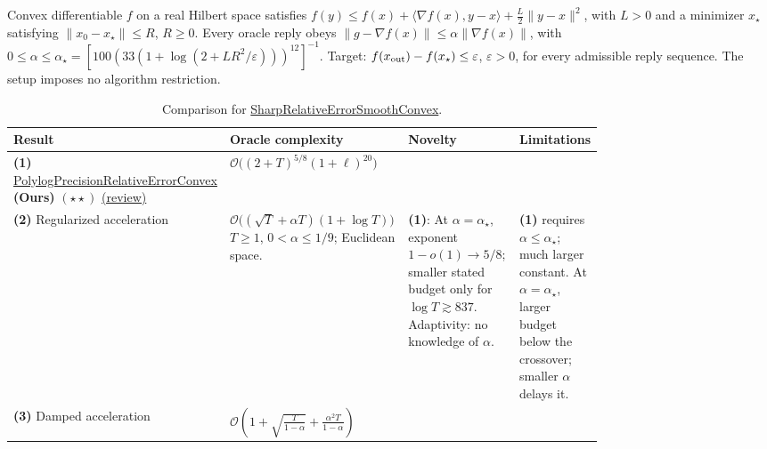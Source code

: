 \begin{table}[tp]
\centering
\caption{Comparison for \href{https://github.com/k3nfalt/longtails/blob/main/LongTails/Setups/SharpRelativeErrorSmoothConvex.lean}{SharpRelativeErrorSmoothConvex}.}\label{tab:SharpRelativeErrorSmoothConvex}
\parbox{\linewidth}{\footnotesize Convex differentiable $f$ on a real Hilbert space satisfies $f(y)\le f(x)+\langle\nabla f(x),y-x\rangle+\frac L2\|y-x\|^2$, with $L>0$ and a minimizer $x_\star$ satisfying $\|x_0-x_\star\|\le R$, $R\ge0$. Every oracle reply obeys $\|g-\nabla f(x)\|\le\alpha\|\nabla f(x)\|$, with $0\le\alpha\le\alpha_\star=[100(33(1+\log(2+LR^2/\varepsilon)))^{12}]^{-1}$. Target: $f(x_{\rm out})-f(x_\star)\le\varepsilon$, $\varepsilon>0$, for every admissible reply sequence. The setup imposes no algorithm restriction.}\par\smallskip
\begin{threeparttable}
\footnotesize
\setlength{\tabcolsep}{4pt}\renewcommand{\arraystretch}{1.25}
\begin{tabularx}{\linewidth}{@{}>{\raggedright\arraybackslash}p{0.20\linewidth}>{\raggedright\arraybackslash}p{0.32\linewidth}>{\raggedright\arraybackslash}p{0.25\linewidth}>{\raggedright\arraybackslash}X@{}}
\toprule
\textbf{Result} & \textbf{Oracle complexity} & \textbf{Novelty} & \textbf{Limitations} \\
\midrule
\textbf{(1)} \href{https://github.com/k3nfalt/longtails/blob/main/LongTails/Theorems/PolylogPrecisionRelativeErrorConvex.lean}{Polylog\allowbreak Precision\allowbreak Relative\allowbreak Error\allowbreak Convex} \textbf{(Ours)} $(\star\star)$ \href{https://github.com/k3nfalt/longtails/blob/main/scripts/reviews/PolylogPrecisionRelativeErrorConvex.md}{(review)}
& $\mathcal{O}\bigl((2+T)^{5/8}(1+\ell)^{20}\bigr)$ & & \\
\midrule[1.2pt]
\textbf{(2)} Regularized acceleration \citep[Theorem~9.3]{pgVasinGasnikov2026v1}
& $\mathcal{O}\bigl((\sqrt T+\alpha T)(1+\log T)\bigr)$\newline
$T\ge1$, $0<\alpha\le1/9$; Euclidean space.
& \textbf{(1)}: At $\alpha=\alpha_\star$, exponent $1-o(1)\to5/8$; smaller stated budget only for $\log T\gtrsim837$. Adaptivity: no knowledge of $\alpha$.
& \textbf{(1)} requires $\alpha\le\alpha_\star$; much larger constant. At $\alpha=\alpha_\star$, larger budget below the crossover; smaller $\alpha$ delays it. \\
\midrule
\textbf{(3)} Damped acceleration \citep{srscDampedRepository}
& $\mathcal{O}\!\left(1+\sqrt{\frac{T}{1-\alpha}}+\frac{\alpha^2T}{1-\alpha}\right)$\newline

\end{tabularx}
\end{threeparttable}
\end{table}
